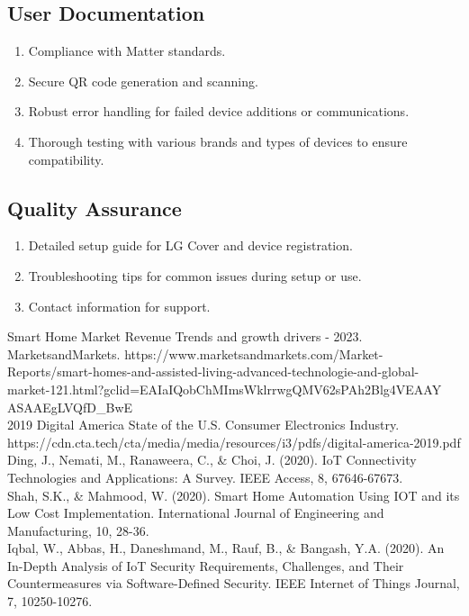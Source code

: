 \documentclass[conference]{IEEEtran}
\begin{document}
\subsection{\large{User Documentation}}
\begin{enumerate}[label=\arabic*.]
\item Compliance with Matter standards.\\
\item Secure QR code generation and scanning.\\
\item Robust error handling for failed device additions or communications.\\
\item Thorough testing with various brands and types of devices to ensure compatibility.\\
\end{enumerate}

\subsection{\large{Quality Assurance}}
\begin{enumerate}[label=\arabic*.]
\item Detailed setup guide for LG Cover and device registration.\\
\item Troubleshooting tips for common issues during setup or use.\\
\item Contact information for support.\\
\end{enumerate}


\begin{thebibliography}{00}
 Smart Home Market Revenue Trends and growth drivers - 2023. MarketsandMarkets. https://www.marketsandmarkets.com/Market-Reports/smart-homes-and-assisted-living-advanced-technologie-and-global-market-121.html?gclid=EAIaIQobChMImsWklrrwgQMV62sPAh2Blg4VEAAY\\ASAAEgLVQfD\_BwE \\
 2019 Digital America State of the U.S. Consumer Electronics Industry. https://cdn.cta.tech/cta/media/media/resources/i3/pdfs/digital-america-2019.pdf \\
 Ding, J., Nemati, M., Ranaweera, C., \& Choi, J. (2020). IoT Connectivity Technologies and Applications: A Survey. IEEE Access, 8, 67646-67673.\\
 Shah, S.K., \& Mahmood, W. (2020). Smart Home Automation Using IOT and its Low Cost Implementation. International Journal of Engineering and Manufacturing, 10, 28-36.\\
 Iqbal, W., Abbas, H., Daneshmand, M., Rauf, B., \& Bangash, Y.A. (2020). An In-Depth Analysis of IoT Security Requirements, Challenges, and Their Countermeasures via Software-Defined Security. IEEE Internet of Things Journal, 7, 10250-10276.
\end{thebibliography}
\end{document}
